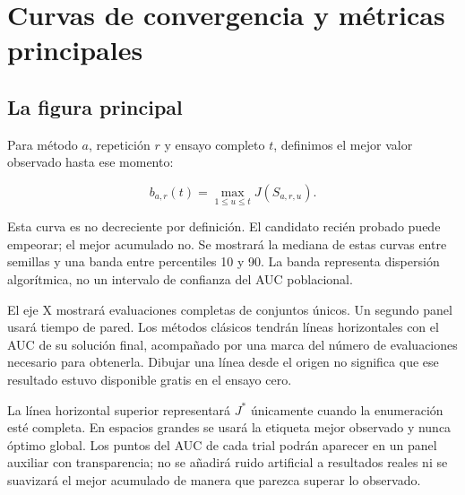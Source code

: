 \documentclass[11pt,letterpaper]{article}
\begin{document}
\section{Curvas de convergencia y métricas principales}\label{sec:11}

\subsection{La figura principal}\label{sec:11.1}

Para método \(a\), repetición \(r\) y ensayo completo \(t\), definimos el mejor valor observado hasta ese momento:

\[
b_{a,r}(t)=\max_{1\leq u\leq t}J(S_{a,r,u}).
\]

Esta curva es no decreciente por definición. El candidato recién probado puede empeorar; el mejor acumulado no. Se mostrará la mediana de estas curvas entre semillas y una banda entre percentiles 10 y 90. La banda representa dispersión algorítmica, no un intervalo de confianza del AUC poblacional.

El eje X mostrará evaluaciones completas de conjuntos únicos. Un segundo panel usará tiempo de pared. Los métodos clásicos tendrán líneas horizontales con el AUC de su solución final, acompañado por una marca del número de evaluaciones necesario para obtenerla. Dibujar una línea desde el origen no significa que ese resultado estuvo disponible gratis en el ensayo cero.

La línea horizontal superior representará \(J^*\) únicamente cuando la enumeración esté completa. En espacios grandes se usará la etiqueta mejor observado y nunca óptimo global. Los puntos del AUC de cada trial podrán aparecer en un panel auxiliar con transparencia; no se añadirá ruido artificial a resultados reales ni se suavizará el mejor acumulado de manera que parezca superar lo observado.
\end{document}
